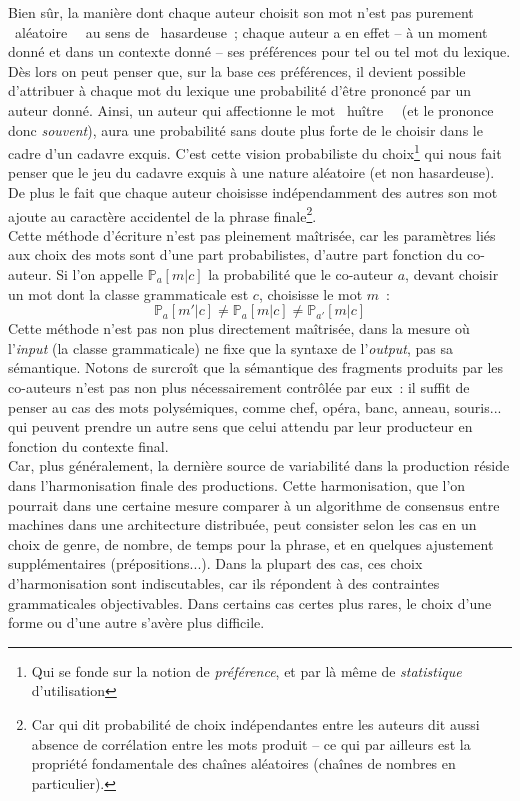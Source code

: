 \documentclass{article}
\begin{document}
				Bien sûr, la manière dont chaque auteur choisit son mot n'est pas purement \guillemotleft~aléatoire~\guillemotright~ au sens de \guillemotleft~hasardeuse~\guillemotright; chaque auteur a en effet -- à un moment donné et dans un contexte donné -- ses préférences pour tel ou tel mot du lexique. Dès lors on peut penser que, sur la base ces préférences, il devient possible  d'attribuer à chaque mot du lexique une probabilité d'être prononcé par un auteur donné. Ainsi, un auteur qui affectionne le mot \guillemotleft~huître~\guillemotright~ (et le prononce donc \textit{souvent}), aura une probabilité sans doute plus forte de le choisir dans le cadre d'un cadavre exquis. C'est cette vision probabiliste du choix\footnote{Qui se fonde sur la notion de \textit{préférence}, et par là même de \textit{statistique} d'utilisation} qui nous fait penser que le jeu du cadavre exquis à une nature aléatoire (et non hasardeuse). De plus le fait que chaque auteur choisisse indépendamment des autres son mot ajoute au caractère accidentel de la phrase finale\footnote{Car qui dit probabilité de choix indépendantes entre les auteurs dit aussi absence de corrélation entre les mots produit -- ce qui par ailleurs est la propriété fondamentale des chaînes aléatoires (chaînes de nombres en particulier).}.\\
				
				Cette méthode d'écriture n'est pas pleinement maîtrisée, car les paramètres liés aux choix des mots sont d'une part probabilistes, d'autre part fonction du co-auteur. Si l'on appelle $\mathbb{P}_a[m|c]$ la probabilité que le co-auteur $a$, devant choisir un mot dont la classe grammaticale est $c$, choisisse le mot $m$~:
				\begin{equation}
					\mathbb{P}_a[m' | c] \neq \mathbb{P}_a[m | c] \neq \mathbb{P}_{a'}[m | c]
				\end{equation}
				Cette méthode n'est pas non plus directement maîtrisée, dans la mesure où l'\textit{input} (la classe grammaticale) ne fixe que la syntaxe de l'\textit{output}, pas sa sémantique. Notons de surcroît que la sémantique des fragments produits par les co-auteurs n'est pas non plus nécessairement contrôlée par eux~: il suffit de penser au cas des mots polysémiques, comme chef, opéra, banc, anneau, souris... qui peuvent prendre un autre sens que celui attendu par leur producteur en fonction du contexte final.\\
				
				Car, plus généralement, la dernière source de variabilité dans la production réside dans l'harmonisation finale des productions. Cette harmonisation, que l'on pourrait dans une certaine mesure comparer à un algorithme de consensus entre machines dans une architecture distribuée, peut consister selon les cas en un choix de genre, de nombre, de temps pour la phrase, et en quelques ajustement supplémentaires (prépositions...). Dans la plupart des cas, ces choix d'harmonisation sont indiscutables, car ils répondent à des contraintes grammaticales objectivables. Dans certains cas certes plus rares, le choix d'une forme ou d'une autre s'avère plus difficile. \\
				
\end{document}
